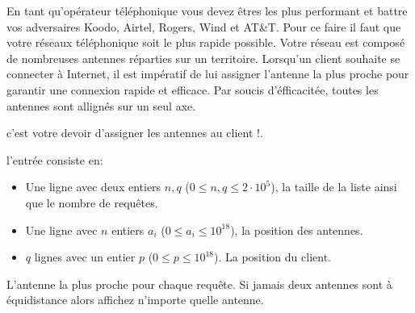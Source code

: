 
\newenvironment{Testgroup}{
	\subsection*{Score}
}{\par}



\newcommand{\maxa}{123456789}

En tant qu'opérateur téléphonique vous devez êtres les plus performant et battre vos adversaires Koodo, Airtel, Rogers, Wind et AT\&T. Pour ce faire il faut que votre réseaux téléphonique soit le plus rapide possible. Votre réseau est composé de nombreuses antennes réparties sur un territoire. Lorsqu’un client souhaite se connecter à Internet, il est impératif de lui assigner l’antenne la plus proche pour garantir une connexion rapide et efficace. Par soucis d'éfficacitée, toutes les antennes sont allignés sur un seul axe.

c'est votre devoir d'assigner les antennes au client !.

\begin{Input}
    l'entrée consiste en:
    \begin{itemize}
        \item Une ligne avec deux entiers $n, q$ ($0\leq n, q\leq 2 \cdot 10^5$), la taille de la liste ainsi que le nombre de requêtes.
        \item Une ligne avec $n$ entiers $a_i$ ($0  \leq a_i \leq 10^{18}$), la position des antennes.
        \item $q$ lignes avec un entier $p$ ($0 \leq p \leq 10^{18}$). La position du client.
    \end{itemize}
\end{Input}

\begin{Output}
    L'antenne la plus proche pour chaque requête. Si jamais deux antennes sont à équidistance alors affichez n'importe quelle antenne.
\end{Output}
